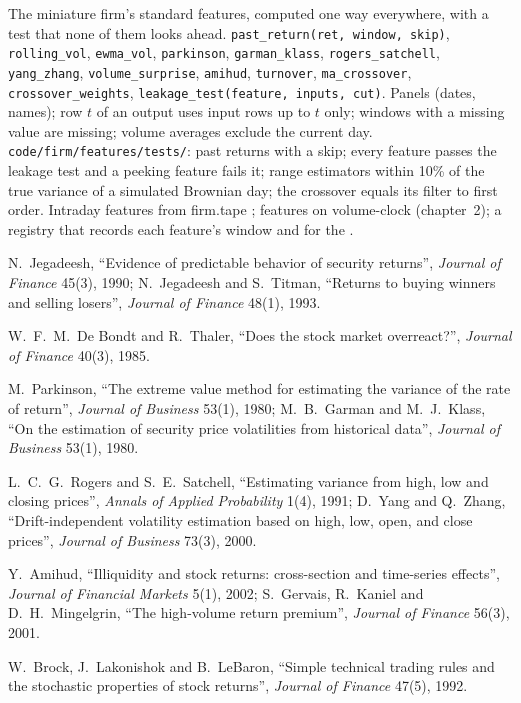 \begin{build}
 The miniature firm's standard  features, computed one way everywhere, with a test that none of them looks ahead.
 \texttt{past\_return(ret, window, skip)}, \texttt{rolling\_vol}, \texttt{ewma\_vol}, \texttt{parkinson},
\texttt{garman\_klass}, \texttt{rogers\_satchell}, \texttt{yang\_zhang}, \texttt{volume\_surprise}, \texttt{amihud},
\texttt{turnover}, \texttt{ma\_crossover}, \texttt{crossover\_weights}, \texttt{leakage\_test(feature, inputs, cut)}.
 Panels (dates, names); row $t$ of an output uses input rows up to $t$ only; windows with a missing value are missing;
volume averages exclude the current day.
 \texttt{code/firm/features/tests/}: past returns with a skip; every feature passes the leakage test and a
peeking feature fails it; range estimators within 10\% of the true variance of a simulated Brownian day; the crossover equals its
filter to first order.
 Intraday features from firm.tape ; features on volume-clock  (chapter~2); a registry that records each
feature's window and  for the .
\end{build}

\begin{omsources}
\item N.~Jegadeesh, ``Evidence of predictable behavior of security returns'', \emph{Journal of Finance} 45(3), 1990; N.~Jegadeesh and
S.~Titman, ``Returns to buying winners and selling losers'', \emph{Journal of Finance} 48(1), 1993.
\item W.~F.~M.~De Bondt and R.~Thaler, ``Does the stock market overreact?'', \emph{Journal of Finance} 40(3), 1985.
\item M.~Parkinson, ``The extreme value method for estimating the variance of the rate of return'', \emph{Journal of Business} 53(1),
1980; M.~B.~Garman and M.~J.~Klass, ``On the estimation of security price volatilities from historical data'', \emph{Journal of
Business} 53(1), 1980.
\item L.~C.~G.~Rogers and S.~E.~Satchell, ``Estimating variance from high, low and closing prices'', \emph{Annals of Applied
Probability} 1(4), 1991; D.~Yang and Q.~Zhang, ``Drift-independent volatility estimation based on high, low, open, and close prices'',
\emph{Journal of Business} 73(3), 2000.
\item Y.~Amihud, ``Illiquidity and stock returns: cross-section and time-series effects'', \emph{Journal of Financial Markets} 5(1),
2002; S.~Gervais, R.~Kaniel and D.~H.~Mingelgrin, ``The high-volume return premium'', \emph{Journal of Finance} 56(3), 2001.
\item W.~Brock, J.~Lakonishok and B.~LeBaron, ``Simple technical trading rules and the stochastic properties of stock returns'',
\emph{Journal of Finance} 47(5), 1992.
\end{omsources}

